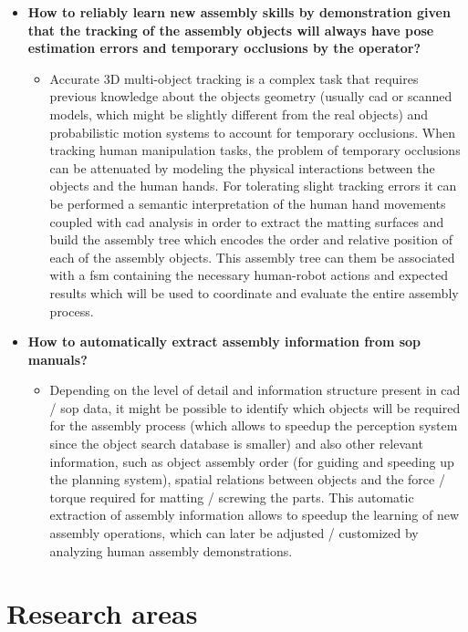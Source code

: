 \begin{itemize}
	\item \textbf{How to reliably learn new assembly skills by demonstration given that the tracking of the assembly objects will always have pose estimation errors and temporary occlusions by the operator?}
	\begin{itemize}
		\item Accurate 3D multi-object tracking is a complex task that requires previous knowledge about the objects geometry (usually \gls{cad} or scanned models, which might be slightly different from the real objects) and probabilistic motion systems to account for temporary occlusions. When tracking human manipulation tasks, the problem of temporary occlusions can be attenuated by modeling the physical interactions between the objects and the human hands. For tolerating slight tracking errors it can be performed a semantic interpretation of the human hand movements coupled with \gls{cad} analysis in order to extract the matting surfaces and build the assembly tree which encodes the order and relative position of each of the assembly objects. This assembly tree can them be associated with a \gls{fsm} containing the necessary human-robot actions and expected results which will be used to coordinate and evaluate the entire assembly process.
	\end{itemize}

	\item \textbf{How to automatically extract assembly information from \gls{sop} manuals?}
	\begin{itemize}
		\item Depending on the level of detail and information structure present in \gls{cad} / \gls{sop} data, it might be possible to identify which objects will be required for the assembly process (which allows to speedup the perception system since the object search database is smaller) and also other relevant information, such as object assembly order (for guiding and speeding up the planning system), spatial relations between objects and the force / torque required for matting / screwing the parts. This automatic extraction of assembly information allows to speedup the learning of new assembly operations, which can later be adjusted / customized by analyzing human assembly demonstrations.
	\end{itemize}
\end{itemize}



\section{Research areas}

